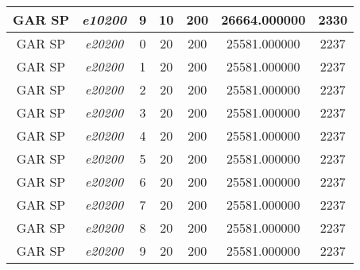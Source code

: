 {\begin{longtable}{cc|c|cc|cc}
			GAR SP             & \textit{e10200}    & 9                               & 10               & 200              & 26664.000000                          & 2330 \\ \hline
			GAR SP             & \textit{e20200}    & 0                               & 20               & 200              & 25581.000000                          & 2237 \\ 
			GAR SP             & \textit{e20200}    & 1                               & 20               & 200              & 25581.000000                          & 2237 \\ 
			GAR SP             & \textit{e20200}    & 2                               & 20               & 200              & 25581.000000                          & 2237 \\ 
			GAR SP             & \textit{e20200}    & 3                               & 20               & 200              & 25581.000000                          & 2237 \\ 
			GAR SP             & \textit{e20200}    & 4                               & 20               & 200              & 25581.000000                          & 2237 \\ 
			GAR SP             & \textit{e20200}    & 5                               & 20               & 200              & 25581.000000                          & 2237 \\ 
			GAR SP             & \textit{e20200}    & 6                               & 20               & 200              & 25581.000000                          & 2237 \\ 
			GAR SP             & \textit{e20200}    & 7                               & 20               & 200              & 25581.000000                          & 2237 \\ 
			GAR SP             & \textit{e20200}    & 8                               & 20               & 200              & 25581.000000                          & 2237 \\ 
			GAR SP             & \textit{e20200}    & 9                               & 20               & 200              & 25581.000000                          & 2237 \\ \hline \hline
			
		\end{longtable}
	}
